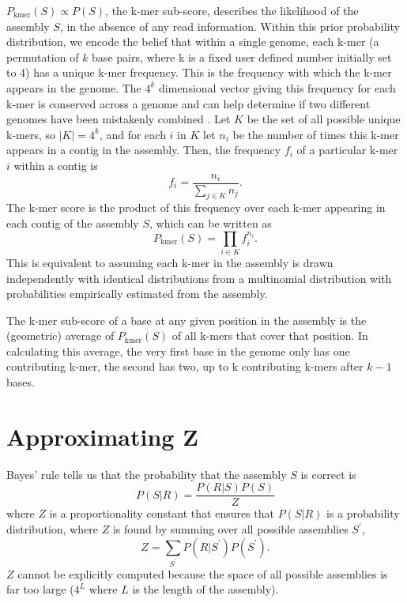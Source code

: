 \documentclass[phd,tocprelim]{cornell}
\begin{document}
$P_{\text{kmer}}(S) \propto P(S)$, the k-mer sub-score, describes the likelihood of the assembly $S$, in the absence of any read information.  Within this prior probability distribution, we encode the belief that within a single genome, each k-mer (a permutation of $k$ base pairs, where k is a fixed user defined number initially set to 4) has a unique k-mer frequency. This is the frequency with which the k-mer appears in the genome.  The $4^{k}$ dimensional vector giving this frequency for each k-mer is conserved across a genome and can help determine if two different genomes have been mistakenly combined \cite{Teeling2004} \cite{Woyke2006}. Let $K$ be the set of all possible unique k-mers, so $|K| = 4^{k}$, and for each $i$ in $K$ let $n_{i}$ be the number of times this k-mer appears in a contig in the assembly. Then, the frequency $f_{i}$ of a particular k-mer $i$ within a contig is
\begin{equation}
    f_{i} = \frac{n_{i}}{\sum_{j\in K}n_{j}}.
\end{equation}
The k-mer score is the product of this frequency over each k-mer appearing in each contig of the assembly $S$, which can be written as
\begin{equation}
    P_{\text{kmer}}(S) = \prod_{i\in K} f_{i}^{n_{i}}.
\end{equation}
This is equivalent to assuming each k-mer in the assembly is drawn independently with identical distributions from a multinomial distribution with probabilities empirically estimated from the assembly.

The k-mer sub-score of a base at any given position in the assembly is the (geometric) average of $P_{\text{kmer}}(S)$ of all k-mers that cover that position. In calculating this average, the very first base in the genome only has one contributing k-mer, the second has two, up to k contributing k-mers after $k-1$ bases.



\section{Approximating Z} %
\label{sec:ApproxZ}

Bayes' rule tells us that the probability that the assembly $S$ is correct is
\begin{equation}
    P(S|R) = \frac{P(R|S)P(S)}{Z}
\end{equation}
where $Z$ is a proportionality constant that ensures that $P(S|R)$ is a probability distribution, where $Z$ is found by summing over all possible assemblies $S^{\prime}$,
\begin{equation}
    Z = \sum_{S^{\prime}}P(R|S^{\prime})P(S^{\prime}).
\end{equation}
$Z$ cannot be explicitly computed because the space of all possible assemblies is far too large ($4^{L}$ where $L$ is the length of the assembly). 
\end{document}
